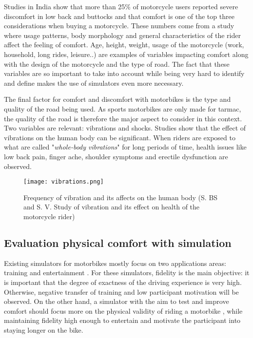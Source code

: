 \documentclass[authoryear,preprint]{sigplanconf}
\begin{document}
Studies in India \cite{IndiaStudy} show that more than 25\% of motorcycle users reported severe discomfort in low back and buttocks and that comfort is one of the top three considerations when buying a motorcycle. These numbers come from a study where usage patterns, body morphology and general characteristics of the rider affect the feeling of comfort. Age, height, weight, usage of the motorcycle (work, household, long rides, leisure..) are examples of variables impacting comfort along with the design of the motorcycle and the type of road. The fact that these variables are so important to take into account while being very hard to identify and define makes the use of simulators even more necessary.

The final factor for comfort and discomfort with motorbikes is the type and quality of the road being used. As sports motorbikes are only made for tarmac, the quality of the road is therefore the major aspect to consider in this context. Two variables are relevant: vibrations and shocks. Studies \cite{Vibrations1} \cite{Vibrations2} show that the effect of vibrations on the human body can be significant. When riders are exposed to what are called "\textit{whole-body vibrations}" for
long periods of time, health issues like low back pain, finger ache, shoulder symptoms and erectile dysfunction are observed.

\begin{figure}[!h]
\centering
\texttt{[image: vibrations.png]}
\caption{Frequency of vibration and its affects on the human body (S.  BS  and  S.  V.   Study  of  vibration  and  its  effect  on  health  of  the motorcycle rider)}
\label{simconcept}
\end{figure}

\subsection{Evaluation physical comfort with simulation}

Existing simulators for motorbikes mostly focus on two applications areas: training \cite{SimuTraining} \cite{Lander} and entertainment \cite{Lean}. For these simulators, fidelity is the main objective: it is important that the degree of exactness of the driving experience is very high. Otherwise, negative transfer of training and low participant motivation will be observed. On the other hand, a simulator with the aim to test and improve comfort should focus more on the physical validity of riding a motorbike \cite{ValiditySimu}, while maintaining fidelity high enough to entertain and motivate the participant into staying longer on the bike.
\end{document}
